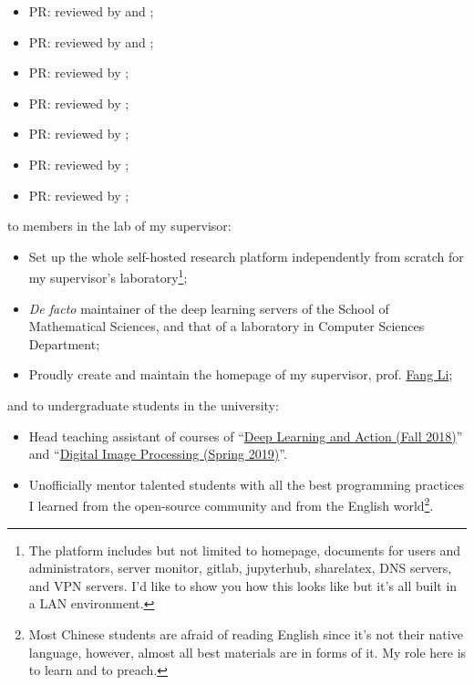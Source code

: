 \begin{itemize}
    \item PR:  reviewed by \evizero and \timholy;
    \item PR:  reviewed by \evizero and \timholy;
    \item PR:  reviewed by \julio;
    \item PR:  reviewed by \timholy;
    \item PR:  reviewed by \mbauman;
    \item PR:  reviewed by \mikeinnes;
    \item PR:  reviewed by \mikeinnes;
\end{itemize}
to members in the lab of my supervisor:
\begin{itemize}
    \item Set up the whole self-hosted research platform independently from scratch for my supervisor's laboratory\footnote{The platform includes but not limited to homepage, documents for users and administrators, server monitor, gitlab, jupyterhub, sharelatex, DNS servers, and VPN servers. I'd like to show you how this looks like but it's all built in a LAN environment.};
    \item \textit{De facto} maintainer of the deep learning servers of the School of Mathematical Sciences, and that of a laboratory in Computer Sciences Department;
    \item Proudly create and maintain the homepage of my supervisor, prof. \href{http://math.ecnu.edu.cn/~fli/}{\textsf{Fang Li}};
\end{itemize}
and to undergraduate students in the university:
\begin{itemize}
    \item Head teaching assistant of courses of ``\href{http://math.ecnu.edu.cn/~fli/Teaching/DeepLearning/Fall2018/index.html}{Deep Learning and Action (Fall 2018)}''  and ``\href{http://math.ecnu.edu.cn/~fli/Teaching/DigitalImageProcessing/Spring2019/index.html}{Digital Image Processing (Spring 2019)}''.
    \item Unofficially mentor talented students with all the best programming practices I learned from the open-source community and from the English world\footnote{Most Chinese students are afraid of reading English since it's not their native language, however, almost all best materials are in forms of it. My role here is to learn and to preach.}.
\end{itemize}

